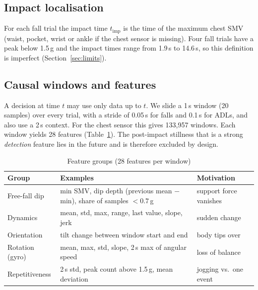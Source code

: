 \documentclass[conference]{IEEEtran}
\begin{document}
\subsection{Impact localisation}
For each fall trial the impact time $t_{\mathrm{imp}}$ is the time of the maximum chest SMV (waist, pocket, wrist or ankle if the chest sensor is missing). Four fall trials have a peak below 1.5\,g and the impact times range from 1.9\,s to 14.6\,s, so this definition is imperfect (Section~\ref{sec:limits}).

\subsection{Causal windows and features}
A decision at time $t$ may use only data up to $t$. We slide a 1\,s window (20 samples) over every trial, with a stride of 0.05\,s for falls and 0.1\,s for ADLs, and also use a 2\,s context. For the chest sensor this gives 133{,}957 windows. Each window yields 28 features (Table~\ref{tab:features}). The post-impact stillness that is a strong \emph{detection} feature lies in the future and is therefore excluded by design.

\begin{table}[t]
\caption{Feature groups (28 features per window)}
\label{tab:features}
\centering
\footnotesize
\begin{tabular}{@{}p{1.9cm}p{3.7cm}p{2.0cm}@{}}
\toprule
Group & Examples & Motivation \\
\midrule
Free-fall dip & min SMV, dip depth (previous mean $-$ min), share of samples $<0.7$\,g & support force vanishes \\
Dynamics & mean, std, max, range, last value, slope, jerk & sudden change \\
Orientation & tilt change between window start and end & body tips over \\
Rotation (gyro) & mean, max, std, slope, 2\,s max of angular speed & loss of balance \\
Repetitiveness & 2\,s std, peak count above 1.5\,g, mean deviation & jogging vs.\ one event \\
\bottomrule
\end{tabular}
\end{table}
\end{document}
